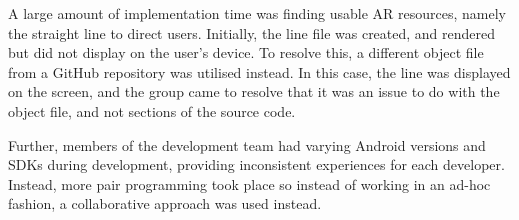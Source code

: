 A large amount of implementation time was finding usable AR resources, namely the straight line to direct users. Initially, the line file was created, and rendered but did not display on the user's device. To resolve this, a different object file from a GitHub repository was utilised instead. In this case, the line was displayed on the screen, and the group came to resolve that it was an issue to do with the object file, and not sections of the source code.

Further, members of the development team had varying Android versions and SDKs during development, providing inconsistent experiences for each developer. Instead, more pair programming took place so instead of working in an ad-hoc fashion, a collaborative approach was used instead.
